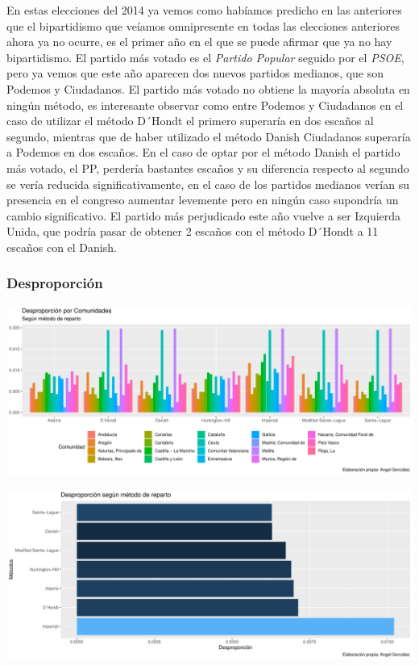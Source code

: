 \documentclass[12pt,a4paper,]{book}
\numberwithin{dummy}{section}
\theoremstyle{ocrenumbox}
\theoremstyle{blacknumex}
\theoremstyle{blacknumbox}
\theoremstyle{ocrenum}
\theoremstyle{ocrenum}
\begin{document}
En estas elecciones del 2014 ya vemos como habíamos predicho en las
anteriores que el bipartidismo que veíamos omnipresente en todas las
elecciones anteriores ahora ya no ocurre, es el primer año en el que se
puede afirmar que ya no hay bipartidismo. El partido más votado es el
\emph{Partido Popular} seguido por el \emph{PSOE}, pero ya vemos que
este año aparecen dos nuevos partidos medianos, que son Podemos y
Ciudadanos. El partido más votado no obtiene la mayoría absoluta en
ningún método, es interesante observar como entre Podemos y Ciudadanos
en el caso de utilizar el método D´Hondt el primero superaría en dos
escaños al segundo, mientras que de haber utilizado el método Danish
Ciudadanos superaría a Podemos en dos escaños. En el caso de optar por
el método Danish el partido más votado, el PP, perdería bastantes
escaños y su diferencia respecto al segundo se vería reducida
significativamente, en el caso de los partidos medianos verían su
presencia en el congreso aumentar levemente pero en ningún caso
supondría un cambio significativo. El partido más perjudicado este año
vuelve a ser Izquierda Unida, que podría pasar de obtener 2 escaños con
el método D´Hondt a 11 escaños con el Danish.

\hypertarget{desproporciuxf3n-11}{%
\subsubsection{Desproporción}\label{desproporciuxf3n-11}}

\begin{center}\includegraphics[width=0.95\linewidth]{figurasR/unnamed-chunk-111-1} \end{center}

\begin{center}\includegraphics[width=0.95\linewidth]{figurasR/unnamed-chunk-111-2} \end{center}
\end{document}
